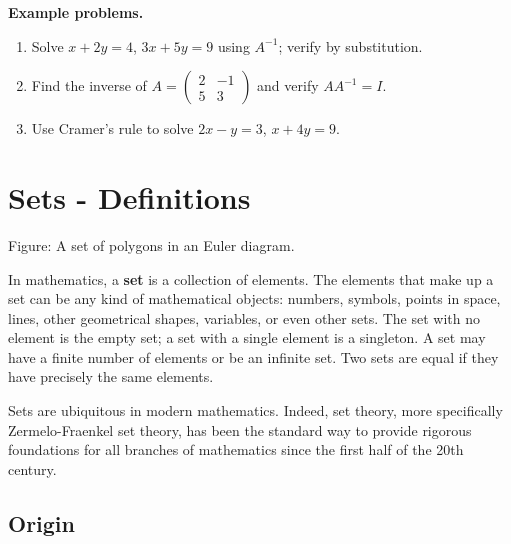 \textbf{Example problems.}
\begin{enumerate}
    \item Solve $x+2y=4$, $3x+5y=9$ using $A^{-1}$; verify by
          substitution.
    \item Find the inverse of $A=\begin{pmatrix}2&-1\\5&3\end{pmatrix}$
          and verify $AA^{-1}=I$.
    \item Use Cramer's rule to solve $2x-y=3$, $x+4y=9$.
\end{enumerate}



\section{Sets - Definitions}
\label{sec:sets-ad2f}





Figure: A set of polygons in an Euler diagram.



In mathematics, a \textbf{set} is a collection of elements. The elements that make up a
set can be any kind of mathematical objects: numbers, symbols, points in space, lines,
other geometrical shapes, variables, or even other sets. The set with no element is the
empty set; a set with a single element is a singleton. A set may have a finite number of
elements or be an infinite set. Two sets are equal if they have precisely the same
elements.



Sets are ubiquitous in modern mathematics. Indeed, set theory, more specifically
Zermelo-Fraenkel set theory, has been the standard way to provide rigorous foundations for
all branches of mathematics since the first half of the 20th century.




\subsection{Origin}
\label{sss:orig-7c49}




